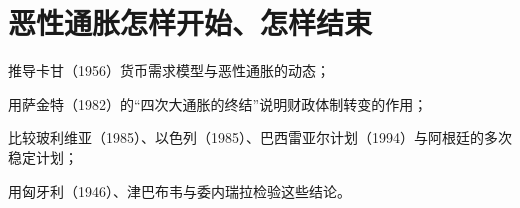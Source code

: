 \chapter{恶性通胀怎样开始、怎样结束}\label{ch:hyperinflation}

\begin{chapterguide}
\begin{guidegoals}
\item 推导卡甘（1956）货币需求模型与恶性通胀的动态；
\item 用萨金特（1982）的“四次大通胀的终结”说明财政体制转变的作用；
\item 比较玻利维亚（1985）、以色列（1985）、巴西雷亚尔计划（1994）与阿根廷的多次稳定计划；
\item 用匈牙利（1946）、津巴布韦与委内瑞拉检验这些结论。
\end{guidegoals}
\end{chapterguide}

\chapterstub
